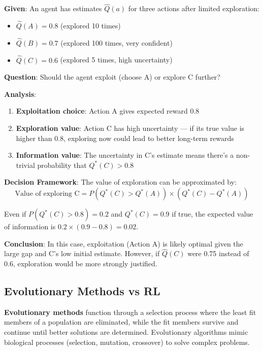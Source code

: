 \documentclass[11pt,a4paper]{article}
\begin{document}
\begin{tcolorbox}[colback=green!5!white,colframe=green!75!black,title=\textbf{Worked Example: Calculating the Exploration Gap}]
\textbf{Given}: An agent has estimates $\hat{Q}(a)$ for three actions after limited exploration:
\begin{itemize}
    \item $\hat{Q}(A) = 0.8$ (explored 10 times)
    \item $\hat{Q}(B) = 0.7$ (explored 100 times, very confident)
    \item $\hat{Q}(C) = 0.6$ (explored 5 times, high uncertainty)
\end{itemize}

\textbf{Question}: Should the agent exploit (choose A) or explore C further?

\textbf{Analysis}:
\begin{enumerate}
    \item \textbf{Exploitation choice}: Action A gives expected reward 0.8
    \item \textbf{Exploration value}: Action C has high uncertainty --- if its true value is higher than 0.8, exploring now could lead to better long-term rewards
    \item \textbf{Information value}: The uncertainty in C's estimate means there's a non-trivial probability that $Q^*(C) > 0.8$
\end{enumerate}

\textbf{Decision Framework}:
The value of exploration can be approximated by:
\[
\text{Value of exploring C} = P(Q^*(C) > Q^*(A)) \times (Q^*(C) - Q^*(A))
\]

Even if $P(Q^*(C) > 0.8) = 0.2$ and $Q^*(C) = 0.9$ if true, the expected value of information is $0.2 \times (0.9 - 0.8) = 0.02$.

\textbf{Conclusion}: In this case, exploitation (Action A) is likely optimal given the large gap and C's low initial estimate. However, if $\hat{Q}(C)$ were 0.75 instead of 0.6, exploration would be more strongly justified.
\end{tcolorbox}

\subsection{Evolutionary Methods vs RL}

\textbf{Evolutionary methods} function through a selection process where the least fit members of a population are eliminated, while the fit members survive and continue until better solutions are determined. Evolutionary algorithms mimic biological processes (selection, mutation, crossover) to solve complex problems.
\end{document}
